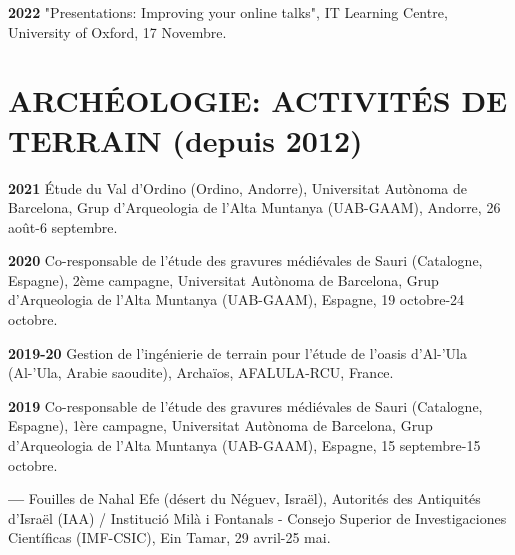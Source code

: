 \documentclass{article}
\newcommand{\fr}[1]{#1}       %
\newcommand{\en}[1]{}     %
\begin{document}
\textbf{2022 }
\fr{"Presentations: Improving your online talks", IT Learning Centre, University of Oxford, 17 Novembre.}
\en{"Presentations: Improving Your Online Talks", IT Learning Centre, University of Oxford, November 17.}
\smallbreak


\section{\fr{ARCHÉOLOGIE: ACTIVITÉS DE TERRAIN (depuis 2012)}\en{ARCHAEOLOGY: FIELD ACTIVITIES (since 2012)}}

\textbf{2021}
\fr{Étude du Val d'Ordino (Ordino, Andorre), Universitat Autònoma de Barcelona, Grup d'Arqueologia de l'Alta Muntanya (UAB-GAAM), Andorre, 26 août-6 septembre.}
\en{Study of the Val d'Ordino (Ordino, Andorra), Autonomous University of Barcelona, High Mountain Archaeology Group (UAB-GAAM), Andorra, August 26 - September 6.}

\smallbreak
\textbf{2020}
\fr{Co-responsable de l'étude des gravures médiévales de Sauri (Catalogne, Espagne), 2ème campagne, Universitat Autònoma de Barcelona, Grup d'Arqueologia de l'Alta Muntanya (UAB-GAAM), Espagne, 19 octobre-24 octobre.}
\en{Co-director of the study of medieval engravings at Sauri (Catalonia, Spain), 2nd campaign, Autonomous University of Barcelona, High Mountain Archaeology Group (UAB-GAAM), Spain, October 19-24.}

\smallbreak
\textbf{2019-20}
\fr{Gestion de l'ingénierie de terrain pour l'étude de l'oasis d'Al-'Ula (Al-'Ula, Arabie saoudite), Archaïos, AFALULA-RCU, France.}
\en{Field engineering management for the study of the Al-'Ula oasis (Al-'Ula, Saudi Arabia), Archaïos, AFALULA-RCU, France.}

\smallbreak
\textbf{2019}
\fr{Co-responsable de l'étude des gravures médiévales de Sauri (Catalogne, Espagne), 1ère campagne, Universitat Autònoma de Barcelona, Grup d'Arqueologia de l'Alta Muntanya (UAB-GAAM), Espagne, 15 septembre-15 octobre.}
\en{Co-director of the study of medieval engravings at Sauri (Catalonia, Spain), 1st campaign, Autonomous University of Barcelona, High Mountain Archaeology Group (UAB-GAAM), Spain, September 15 - October 15.}

\smallbreak
\textbf{--- }
\fr{Fouilles de Nahal Efe (désert du Néguev, Israël), Autorités des Antiquités d'Israël (IAA) / Institució Milà i Fontanals - Consejo Superior de Investigaciones Científicas (IMF-CSIC), Ein Tamar, 29 avril-25 mai.}
\en{Excavations at Nahal Efe (Negev Desert, Israel), Israel Antiquities Authority (IAA) / Institució Milà i Fontanals - Spanish National Research Council (IMF-CSIC), Ein Tamar, April 29 - May 25.}
\end{document}
